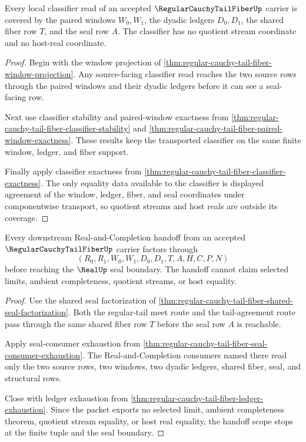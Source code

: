 \begin{theorem}
\label{thm:regular-cauchy-tail-fiber-window-fiber-classifier-coverage}
Every local classifier read of an accepted $\RegularCauchyTailFiberUp$ carrier is covered by the paired windows $W_0,W_1$, the dyadic ledgers $D_0,D_1$, the shared fiber row $T$, and the seal row $A$. The classifier has no quotient stream coordinate and no host-real coordinate.
\end{theorem}
\begin{proof}
Begin with the window projection of \autoref{thm:regular-cauchy-tail-fiber-window-projection}. Any source-facing classifier read reaches the two source rows through the paired windows and their dyadic ledgers before it can see a seal-facing row.

Next use classifier stability and paired-window exactness from \autoref{thm:regular-cauchy-tail-fiber-classifier-stability} and \autoref{thm:regular-cauchy-tail-fiber-paired-window-exactness}. These results keep the transported classifier on the same finite window, ledger, and fiber support.

Finally apply classifier exactness from \autoref{thm:regular-cauchy-tail-fiber-classifier-exactness}. The only equality data available to the classifier is displayed agreement of the window, ledger, fiber, and seal coordinates under componentwise transport, so quotient streams and host reals are outside its coverage.
\end{proof}

\begin{theorem}
\label{thm:regular-cauchy-tail-fiber-completion-handoff-scope}
Every downstream Real-and-Completion handoff from an accepted $\RegularCauchyTailFiberUp$ carrier factors through
$$
(R_0,R_1,W_0,W_1,D_0,D_1,T,A,H,C,P,N)
$$
before reaching the $\RealUp$ seal boundary. The handoff cannot claim selected limits, ambient completeness, quotient streams, or host equality.
\end{theorem}
\begin{proof}
Use the shared seal factorization of \autoref{thm:regular-cauchy-tail-fiber-shared-seal-factorization}. Both the regular-tail meet route and the tail-agreement route pass through the same shared fiber row $T$ before the seal row $A$ is reachable.

Apply seal-consumer exhaustion from \autoref{thm:regular-cauchy-tail-fiber-seal-consumer-exhaustion}. The Real-and-Completion consumers named there read only the two source rows, two windows, two dyadic ledgers, shared fiber, seal, and structural rows.

Close with ledger exhaustion from \autoref{thm:regular-cauchy-tail-fiber-ledger-exhaustion}. Since the packet exports no selected limit, ambient completeness theorem, quotient stream equality, or host real equality, the handoff scope stops at the finite tuple and the seal boundary.
\end{proof}

